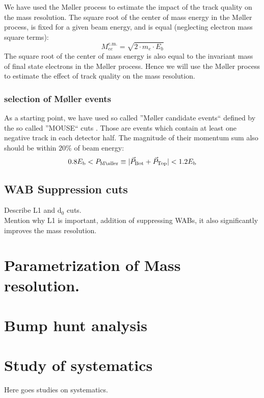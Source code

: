 \documentclass[letterpaper,12pt]{article}
\def \dstl {\displaystyle}
\def \Mlr {M\o ller }
\begin{document}
We have used the \Mlr process to estimate the impact of the track quality on the mass resolution. The square root of the center of mass energy in the \Mlr process, is fixed for a given beam energy, and is equal (neglecting electron mass square terms):
\begin{equation}
 \dstl M_{ee}^{\mathrm{c.m.}} = \sqrt{2\cdot m_{e}\cdot E_{b}}
\end{equation}
The square root of the center of mass energy is also equal to the invariant mass of final state electrons in the \Mlr process. Hence we will use the \Mlr process to estimate the effect of track quality on the mass resolution.

\subsubsection{selection of \Mlr events}
As a starting point, we have used so called ''\Mlr candidate events`` defined by the so called ''MOUSE`` cuts \cite{MOUSE_Cuts}. Those are events which contain at least one negative track in each detector half. The magnitude of their momentum sum also should be within $\mathrm{20\%}$ of beam energy:
\begin{equation}
 0.8E_{\mathrm{b}} < P_{\mathrm{\Mlr}} \equiv |\vec{P}_{\mathrm{Bot}} + \vec{P}_{\mathrm{Top}}| < 1.2E_{\mathrm{b}}
\end{equation}


\subsection{WAB Suppression cuts}
Describe L1 and $\mathrm{d_{0}}$ cuts. \\
Mention why L1 is important, addition of suppressing WABs, it also significantly
improves the mass resolution.


\section{Parametrization of Mass resolution.}

\section{Bump hunt analysis}


\section{Study of systematics}
Here goes studies on systematics.
\end{document}
